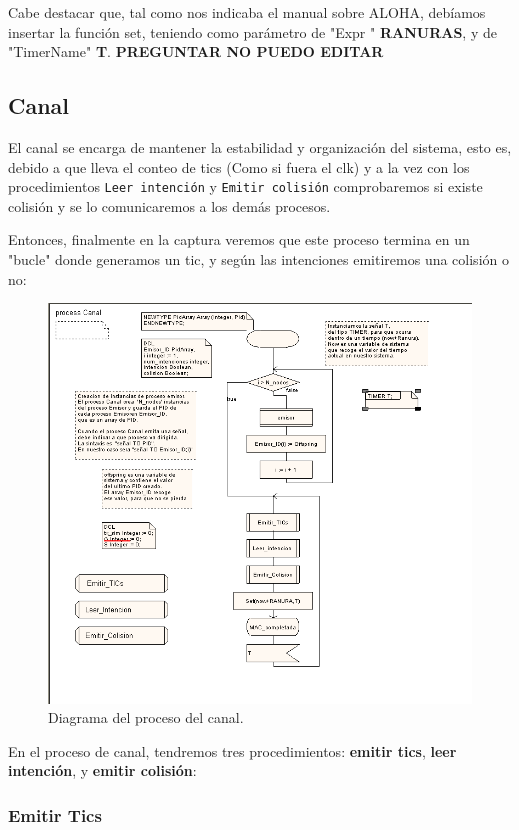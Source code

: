 \documentclass{article}
\begin{document}
\quad

Cabe destacar que, tal como nos indicaba el manual sobre ALOHA, debíamos insertar la función set, teniendo como parámetro de "\(\)Expr " \textbf{RANURAS}, y de "TimerName" \textbf{T}. \textbf{PREGUNTAR NO PUEDO EDITAR}

\subsection{Canal}

El canal se encarga de mantener la estabilidad y organización del sistema, esto es, debido a que lleva el conteo de tics (Como si fuera el clk) y a la vez con los procedimientos \verb|Leer intención| y \verb|Emitir colisión| comprobaremos si existe colisión y se lo comunicaremos a los demás procesos.

\quad

Entonces, finalmente en la captura veremos que este proceso termina en un "bucle" donde generamos un tic, y según las intenciones emitiremos una colisión o no:

\begin{figure}[h]
    \centering
    \includegraphics[width=0.8\linewidth]{src/proceso canal.png}
    \caption{\label{fig:canalproceso} Diagrama del proceso del canal.}
\end{figure}


En el proceso de canal, tendremos tres procedimientos: \textbf{emitir tics}, \textbf{leer intención}, y \textbf{emitir colisión}:

\subsubsection{Emitir Tics}
\end{document}
